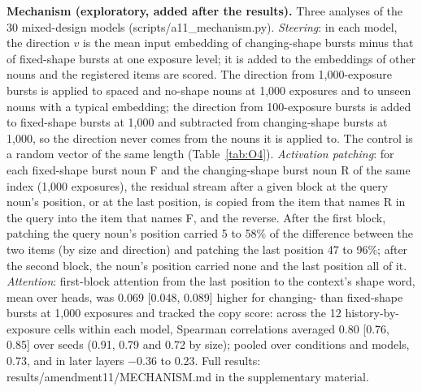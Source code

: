\textbf{Mechanism (exploratory, added after the results).} Three analyses of the 30 mixed-design models (scripts/a11\_mechanism.py). \emph{Steering}: in each model, the direction $v$ is the mean input embedding of changing-shape bursts minus that of fixed-shape bursts at one exposure level; it is added to the embeddings of other nouns and the registered items are scored. The direction from 1,000-exposure bursts is applied to spaced and no-shape nouns at 1,000 exposures and to unseen nouns with a typical embedding; the direction from 100-exposure bursts is added to fixed-shape bursts at 1,000 and subtracted from changing-shape bursts at 1,000, so the direction never comes from the nouns it is applied to. The control is a random vector of the same length (Table~\ref{tab:O4}). \emph{Activation patching}: for each fixed-shape burst noun F and the changing-shape burst noun R of the same index (1,000 exposures), the residual stream after a given block at the query noun's position, or at the last position, is copied from the item that names R in the query into the item that names F, and the reverse. After the first block, patching the query noun's position carried 5 to 58\% of the difference between the two items (by size and direction) and patching the last position 47 to 96\%; after the second block, the noun's position carried none and the last position all of it. \emph{Attention}: first-block attention from the last position to the context's shape word, mean over heads, was 0.069 [0.048, 0.089] higher for changing- than fixed-shape bursts at 1,000 exposures and tracked the copy score: across the 12 history-by-exposure cells within each model, Spearman correlations averaged 0.80 [0.76, 0.85] over seeds (0.91, 0.79 and 0.72 by size); pooled over conditions and models, 0.73, and in later layers $-$0.36 to 0.23. Full results: results/amendment11/MECHANISM.md in the supplementary material.

\begin{table}[!htbp]
\centering\small
\caption{Experiment 3, steering (exploratory): copy score with the noun's own embedding (baseline; typical embedding for unseen nouns) and change when the changing-minus-fixed burst direction from other nouns, or a random vector of the same length, is added to the embedding (nats; ten seeds, sizes averaged). Nouns at 1,000 exposures. $^a$Direction from 100-exposure bursts. $^b$Direction from 100-exposure bursts subtracted.}
\label{tab:O4}

\end{table}

